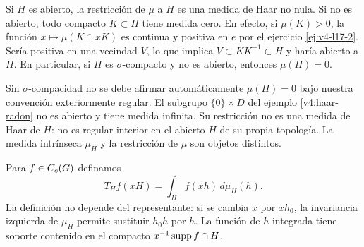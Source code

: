 \begin{observacion}\label{v4:mod-subgrupo-nulo}
Si $H$ es abierto, la restricción de $\mu$ a $H$ es una medida de Haar no nula. Si no es abierto, todo compacto $K\subset H$ tiene medida cero. En efecto, si $\mu(K)>0$, la función $x\mapsto\mu(K\cap xK)$ es continua y positiva en $e$ por el ejercicio \ref{ej:v4-l17-2}. Sería positiva en una vecindad $V$, lo que implica $V\subset KK^{-1}\subset H$ y haría abierto a $H$. En particular, si $H$ es $\sigma$-compacto y no es abierto, entonces $\mu(H)=0$.

Sin $\sigma$-compacidad no se debe afirmar automáticamente $\mu(H)=0$ bajo nuestra convención exteriormente regular. El subgrupo $\{0\}\times D$ del ejemplo \ref{v4:haar-radon} no es abierto y tiene medida infinita. Su restricción no es una medida de Haar de $H$: no es regular interior en el abierto $H$ de su propia topología. La medida intrínseca $\mu_H$ y la restricción de $\mu$ son objetos distintos.
\end{observacion}

Para $f\in C_c(G)$ definamos
\[
 T_Hf(xH)=\int_H f(xh)\,d\mu_H(h).
\]
La definición no depende del representante: si se cambia $x$ por $xh_0$, la invariancia izquierda de $\mu_H$ permite sustituir $h_0h$ por $h$. La función de $h$ integrada tiene soporte contenido en el compacto $x^{-1}\operatorname{supp} f\cap H$.

